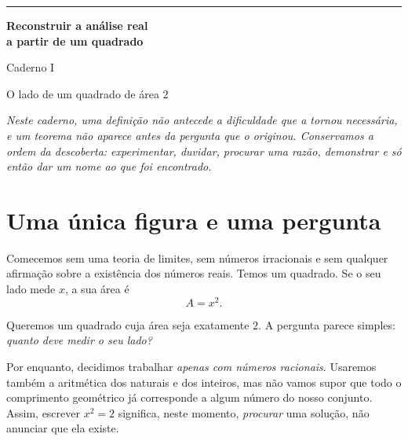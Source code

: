 \documentclass[11pt,a4paper]{article}
\begin{document}
\thispagestyle{empty}
\vspace*{18mm}
{\color{azul}\rule{28mm}{1.2pt}}\par\vspace{13mm}
{\Huge\bfseries Reconstruir a análise real\\[4mm] a partir de um quadrado}\par
\vspace{13mm}
{\Large Caderno I}\par\vspace{3mm}
{\large O lado de um quadrado de área $2$}\par
\vspace{17mm}
\begin{center}
\end{center}
\vfill
\noindent\begin{minipage}{.94\linewidth}
\small
\textit{Neste caderno, uma definição não antecede a dificuldade que a tornou necessária, e um teorema não aparece antes da pergunta que o originou. Conservamos a ordem da descoberta: experimentar, duvidar, procurar uma razão, demonstrar e só então dar um nome ao que foi encontrado.}
\end{minipage}
\vspace{12mm}
\newpage

\section{Uma única figura e uma pergunta}

Comecemos sem uma teoria de limites, sem números irracionais e sem qualquer afirmação sobre a existência dos números reais. Temos um quadrado. Se o seu lado mede $x$, a sua área é
\[
A=x^2.
\]

Queremos um quadrado cuja área seja exatamente $2$. A pergunta parece simples: \emph{quanto deve medir o seu lado?}

Por enquanto, decidimos trabalhar \emph{apenas com números racionais}. Usaremos também a aritmética dos naturais e dos inteiros, mas não vamos supor que todo o comprimento geométrico já corresponde a algum número do nosso conjunto. Assim, escrever $x^2=2$ significa, neste momento, \emph{procurar} uma solução, não anunciar que ela existe.
\end{document}
